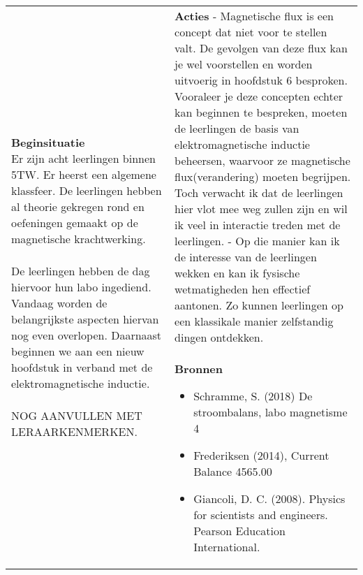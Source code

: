 \begin{landscape}
	\begin{tabularx}{1.56\textwidth}{|p{}|X|}
		\hline
		\multirow{2}{0.55\textwidth}{\textbf{Beginsituatie}\newline  
		Er zijn acht leerlingen binnen 5TW. Er heerst een algemene klassfeer. De leerlingen hebben al theorie gekregen  rond en oefeningen gemaakt op de magnetische krachtwerking. \newline\newline De leerlingen hebben de dag hiervoor hun labo ingediend. Vandaag worden de belangrijkste aspecten hiervan nog even overlopen. Daarnaast beginnen we aan een nieuw hoofdstuk in verband met de elektromagnetische inductie. \newline\newline NOG AANVULLEN MET LERAARKENMERKEN.} & \textbf{Acties}\newline\newline  
		- Magnetische flux is een concept dat niet voor te stellen valt. De gevolgen van deze flux kan je wel voorstellen en worden uitvoerig in hoofdstuk 6 besproken. Vooraleer je deze concepten echter kan beginnen te bespreken, moeten de leerlingen de basis van elektromagnetische inductie beheersen, waarvoor ze magnetische flux(verandering) moeten begrijpen. Toch verwacht ik dat de leerlingen hier vlot mee weg zullen zijn en wil ik veel in interactie treden met de leerlingen. \newline\newline
		- \GreenHighlight{Via demo's wil ik bepaalde onderwerpen starten.}{9cm}	Op die manier kan ik de interesse van de leerlingen wekken en kan ik fysische wetmatigheden hen effectief aantonen. Zo kunnen leerlingen op een klassikale manier zelfstandig dingen ontdekken.	
		\newline\newline\newline\newline\newline\newline\newline\newline
		
		\\ \cline{2-2}
		  & \textbf{Bronnen}\begin{itemize}
		  	\item Schramme, S. (2018) De stroombalans, labo magnetisme 4
		  	\item Frederiksen (2014), Current Balance 4565.00
		  	\item Giancoli, D. C. (2008). Physics for scientists and engineers. Pearson Education International.
		  \end{itemize}\\ \hline
	\end{tabularx}



\end{landscape}
